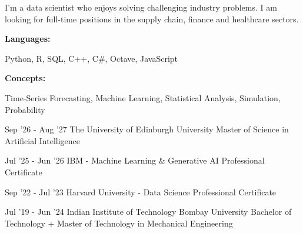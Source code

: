 \documentclass[9pt]{developercv}
\begin{document}

\begin{minipage}[t]{0.46\textwidth}
	\vspace{-6pt}
 
	I'm a data scientist who enjoys solving challenging industry problems. I am looking for full-time positions in the supply chain, finance and healthcare sectors. \\
\end{minipage}
\hfill
\begin{minipage}[t]{0.465\textwidth}
    \vspace{-6pt}
    
    \begin{minipage}[t]{0.2\textwidth}
        \textbf{Languages:}
    \end{minipage}
    \hfill
    \begin{minipage}[t]{0.75\textwidth}
      Python, R, SQL, C++, C\#, Octave, JavaScript
    \end{minipage}
    \vspace{5pt}
    
    \begin{minipage}[t]{0.2\textwidth}
        \textbf{Concepts:}
    \end{minipage}
    \hfill
    \begin{minipage}[t]{0.76\textwidth}
      Time-Series Forecasting, Machine Learning, Statistical Analysis, Simulation, Probability
    \end{minipage}
\end{minipage}

\vspace{-8 pt}
\vspace{-2.5pt}

\begin{entrylist}
    \vspace{-5pt}

    \entry
		{Sep '26 - Aug '27}
		{The University of Edinburgh}
		{University}
		{Master of Science in Artificial Intelligence}
    \vspace{-13.5pt}

     \entry
		{Jul '25 - Jun '26}
		{IBM - Machine Learning \& Generative AI}
		{Professional Certificate}
            {}
    \vspace{-13.5pt}

    \entry
		{Sep '22 - Jul '23}
		{Harvard University - Data Science}
		{Professional Certificate}
            {}

    \entry
		{Jul '19 - Jun '24}
		{Indian Institute of Technology Bombay}
		{University}
		{Bachelor of Technology + Master of Technology in Mechanical Engineering}
    \vspace{-2.5pt}
    
\end{entrylist}
\end{document}
